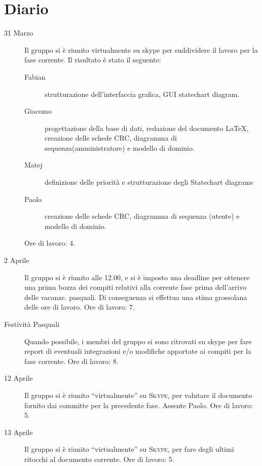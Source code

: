 \section{Diario}
\begin{description}
\item[31 Marzo]
Il gruppo si è riunito virtualmente su skype per suddividere il lavoro per la fase corrente. Il risultato è stato il seguente:
\begin{description}
\item[Fabian] strutturazione dell'interfaccia grafica, GUI statechart diagram.
\item[Giacomo] progettazione della base di dati, redazione del documento \LaTeX, creazione delle schede CRC, diagramma di sequenza(amministratore) e modello di dominio.
\item[Matej] definizione delle priorità e strutturazione degli Statechart diagrams
\item[Paolo] creazione delle schede CRC, diagramma di sequenza (utente) e modello di dominio.
\end{description}
\medskip
Ore di lavoro: 4.
\bigskip

\item[2 Aprile]
Il gruppo si è riunito alle 12.00, e si è imposto una deadline per ottenere una 
prima bozza dei compiti relativi alla corrente fase prima dell'arrivo delle 
vacanze. pasquali. Di conseguenza si effettua una stima grossolana delle ore
di lavoro.
\medskip
Ore di lavoro: 7.
\bigskip

\item[Festività Pasquali]
Quando possibile, i membri del gruppo si sono ritrovati su skype per fare report
di eventuali integrazioni e/o modifiche apportate ai compiti per la fase corrente.
\medskip
Ore di lavoro: 8.
\bigskip

\item[12 Aprile]
Il gruppo si è riunito ``virtualmente'' su \textsc{Skype}, per valutare il documento fornito 
dai committe per la precedente fase. Assente Paolo.
\medskip
Ore di lavoro: 5.
\bigskip

\item[13 Aprile]
Il gruppo si è riunito ``virtualmente'' su \textsc{Skype}, per fare degli ultimi ritocchi al
documento corrente.
\medskip
Ore di lavoro: 5.	
\end{description}

